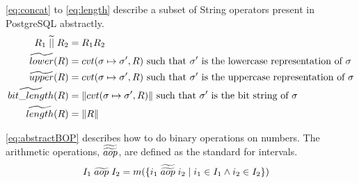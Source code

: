 \autoref{eq:concat} to \ref{eq:length} describe a subset of String operators present in PostgreSQL abstractly.
\begin{align}\label{eq:concat}
    R_1 \;\aab{||}\; R_2 &= R_1R_2 \\
    \aab{lower}(R) &= cvt(\sigma \mapsto \sigma', R) \text{ such that $\sigma'$ is the lowercase representation of $\sigma$}\\
    \aab{upper}(R) &= cvt(\sigma \mapsto \sigma', R) \text{ such that $\sigma'$ is the uppercase representation of $\sigma$}\\
    \aab{bit\_length}(R) &= \|cvt(\sigma \mapsto \sigma', R)\| \text{ such that $\sigma'$ is the bit string of $\sigma$} \\ \label{eq:length}
    \aab{length}(R) &= \|R\|
\end{align}

\autoref{eq:abstractBOP} describes how to do binary operations on numbers.
The arithmetic operations, $\widetilde{\widetilde{aop}}$, are defined as the standard for intervals.
\begin{align}
    I_1 \;\aab{aop}\; I_2 &= m(\{i_1 \; \aaab{aop} \; i_2 \mid i_1 \in I_1 \land i_2 \in I_2\})  \label{eq:abstractBOP}
\end{align}

